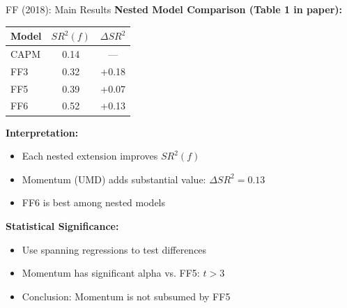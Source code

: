 \documentclass{beamer}
\begin{document}
\begin{frame}{FF (2018): Main Results}
    \textbf{Nested Model Comparison (Table 1 in paper):}
    
    
    \begin{table}
        \small
        \begin{tabular}{lcc}
            \toprule
            \textbf{Model} & \textbf{$SR^2(f)$} & \textbf{$\Delta SR^2$} \\
            \midrule
            CAPM & 0.14 & --- \\
            FF3 & 0.32 & +0.18 \\
            FF5 & 0.39 & +0.07 \\
            FF6 & 0.52 & +0.13 \\
            \bottomrule
        \end{tabular}
    \end{table}
    
    \vspace{0.3cm}
    \textbf{Interpretation:}
    \begin{itemize}
        \item Each nested extension improves $SR^2(f)$
        \item Momentum (UMD) adds substantial value: $\Delta SR^2 = 0.13$
        \item FF6 is best among nested models
    \end{itemize}
    
    
    \textbf{Statistical Significance:}
    \begin{itemize}
        \item Use spanning regressions to test differences
        \item Momentum has significant alpha vs. FF5: $t > 3$
        \item Conclusion: Momentum is not subsumed by FF5
    \end{itemize}
\end{frame}
\end{document}
